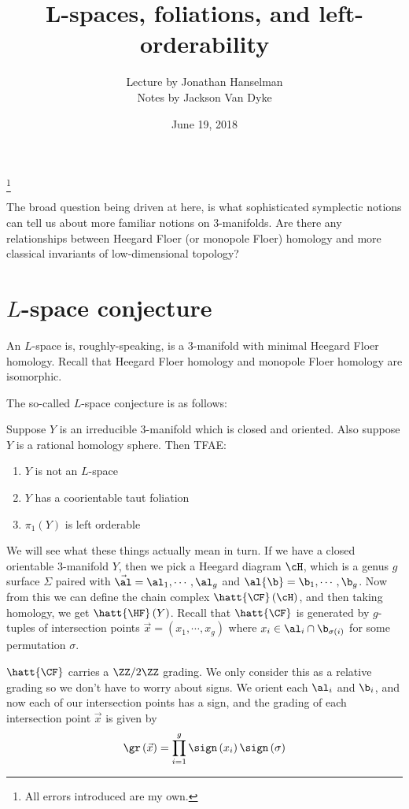 \documentclass{amsart}
\begin{document}
\title{L-spaces, foliations, and left-orderability}
\author{Lecture by Jonathan Hanselman\\
Notes by Jackson Van Dyke}
\thanks{All errors introduced are my own.}
\date{June 19, 2018}
\maketitle

The broad question being driven at here, is what sophisticated symplectic 
notions can tell us about more familiar notions on $3$-manifolds.
Are there any relationships between Heegard Floer (or monopole Floer) homology
and more classical invariants of low-dimensional topology?

\section{$L$-space conjecture}

An $L$-space is, roughly-speaking, is
a $3$-manifold with minimal Heegard Floer homology.
Recall that Heegard Floer homology and monopole Floer homology
are isomorphic.

The so-called $L$-space conjecture is as follows:

\begin{con}
Suppose $Y$ is an irreducible $3$-manifold which is closed and oriented. 
Also suppose $Y$ is a rational homology sphere.
Then TFAE:
\begin{enumerate}
\item $Y$ is not an $L$-space
\item $Y$ has a coorientable taut foliation
\item $\pi_1\left( Y \right)$ is left orderable
\end{enumerate}
\end{con}

We will see what these things actually mean in turn.
If we have a closed orientable $3$-manifold $Y$, 
then we pick a Heegard diagram $\cH$, which is a genus $g$ surface $\Sigma$ paired
with $\vec{\al} = \al_1 , \cdots , \al_g$ and $\al{\b} = \b_1 , \cdots , \b_g$.
Now from this we can define the
chain complex $\hatt{\CF}\left( \cH \right)$,
and then taking homology, we get $\hatt{\HF}\left( Y \right)$.
Recall that $\hatt{\CF}$ is generated by $g$-tuples of intersection
points $\vec{x} = \left( x_1 , \cdots ,x_g \right)$ where
$x_i \in \al_i \cap \b_{\sigma\left( i \right)}$ for some permutation $\sigma$. 

$\hatt{\CF}$ carries a $\ZZ  /2\ZZ$ grading.
We only consider this as a relative grading so we don't have to worry about signs.
We orient each $\al_i$ and $\b_i$, and now each of our intersection points has a sign,
and the grading of each intersection point $\vec{x}$ is given by
\begin{equation}
\gr\left( \vec{x} \right) = 
\prod_{i = 1}^g \sign\left( x_i \right)
\sign\left( \sigma \right)
\end{equation}
\end{document}
